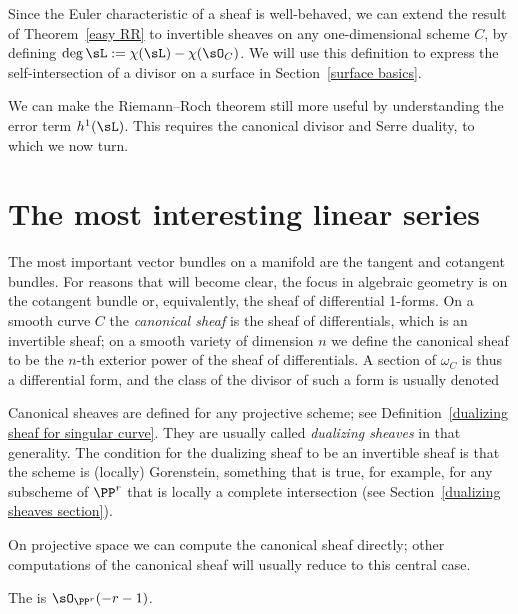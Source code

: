 Since the Euler characteristic of a sheaf is well-behaved, we can extend the result of Theorem~\ref{easy RR} 
to invertible sheaves on any one-dimensional scheme $C$, by defining
$\deg \sL := \chi(\sL) -\chi(\sO_C)$.
We will use this definition to express the self-intersection of a divisor on a surface in Section~\ref{surface basics}.

We can make the Riemann--Roch theorem still more useful by understanding the error term $h^1(\sL)$. This requires
the canonical divisor and Serre duality, to which
we now turn.


\section{The most interesting linear series}\label{most interesting}

The most important vector bundles on a manifold are the tangent and cotangent bundles. For reasons that
will become clear, the focus in algebraic geometry is on the cotangent
bundle or, equivalently, the sheaf of differential 1-forms. On a
smooth curve $C$ the \emph{canonical sheaf} is the sheaf of
differentials, which is an 
%
invertible sheaf; on a smooth
variety of dimension $n$ we define the canonical sheaf to be the 
$n$-th exterior power of the sheaf of differentials. A section of 
$\omega_C$ is thus a differential form, and the class of the divisor
of such a form is usually denoted 
%

\begin{fact}
Canonical sheaves are defined for any projective scheme; see 
Definition~\ref{dualizing sheaf for singular curve}.
They are usually called 
%
{\it dualizing sheaves} 
in that generality. The condition for the dualizing sheaf to be an invertible
%
sheaf is that the scheme is (locally) Gorenstein, something that is true, for example, for any subscheme of $\PP^r$
that is locally a complete intersection (see Section~\ref{dualizing sheaves section}).
\end{fact}
 

On projective space we can compute the canonical sheaf directly; other computations of the canonical sheaf will usually reduce to this central case.

\begin{theorem}
 The 
%
is $\sO_{\PP^{r}}(-r-1)$. 
\vspace*{-\parskip}
\end{theorem}

